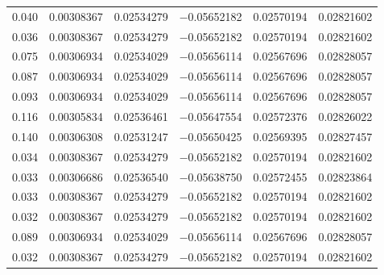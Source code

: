 \begin{table}[p]
\begin{tabularx}{\textwidth}{l *{5}{C}}
        \FastEmbedding{} \num{0.040} & \num{0.00308367} & \num{0.02534279} & \num{-0.05652182} & \num{0.02570194} & \num{0.02821602} \\
        \FastEmbedding{} \num{0.036} & \num{0.00308367} & \num{0.02534279} & \num{-0.05652182} & \num{0.02570194} & \num{0.02821602} \\
        \NormalEmbedding{} \num{0.075} & \num{0.00306934} & \num{0.02534029} & \num{-0.05656114} & \num{0.02567696} & \num{0.02828057} \\
        \NormalEmbedding{} \num{0.087} & \num{0.00306934} & \num{0.02534029} & \num{-0.05656114} & \num{0.02567696} & \num{0.02828057} \\
        \NormalEmbedding{} \num{0.093} & \num{0.00306934} & \num{0.02534029} & \num{-0.05656114} & \num{0.02567696} & \num{0.02828057} \\
        \OtherEmbedding{} \num{0.116} & \num{0.00305834} & \num{0.02536461} & \num{-0.05647554} & \num{0.02572376} & \num{0.02826022} \\
        \OtherEmbedding{} \num{0.140} & \num{0.00306308} & \num{0.02531247} & \num{-0.05650425} & \num{0.02569395} & \num{0.02827457} \\
        \FastEmbedding{} \num{0.034} & \num{0.00308367} & \num{0.02534279} & \num{-0.05652182} & \num{0.02570194} & \num{0.02821602} \\
        \FastEmbedding{} \num{0.033} & \num{0.00306686} & \num{0.02536540} & \num{-0.05638750} & \num{0.02572455} & \num{0.02823864} \\
        \FastEmbedding{} \num{0.033} & \num{0.00308367} & \num{0.02534279} & \num{-0.05652182} & \num{0.02570194} & \num{0.02821602} \\
        \FastEmbedding{} \num{0.032} & \num{0.00308367} & \num{0.02534279} & \num{-0.05652182} & \num{0.02570194} & \num{0.02821602} \\
        \NormalEmbedding{} \num{0.089} & \num{0.00306934} & \num{0.02534029} & \num{-0.05656114} & \num{0.02567696} & \num{0.02828057} \\
        \FastEmbedding{} \num{0.032} & \num{0.00308367} & \num{0.02534279} & \num{-0.05652182} & \num{0.02570194} & \num{0.02821602} \\
        \bottomrule
    \end{tabularx}
\end{table}
